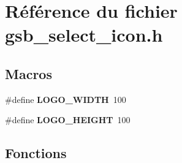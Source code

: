 \section{Référence du fichier gsb\_\-select\_\-icon.h}
\label{gsb__select__icon_8h}
\subsection*{Macros}
\begin{DoxyCompactItemize}
\item 
\#define {\bf LOGO\_\-WIDTH}~100
\item 
\#define {\bf LOGO\_\-HEIGHT}~100
\end{DoxyCompactItemize}
\subsection*{Fonctions}
